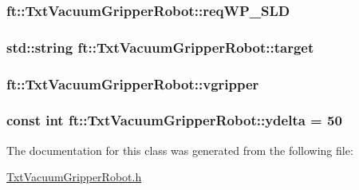 \subsubsection[{\texorpdfstring{req\+W\+P\+\_\+\+S\+LD}{reqWP_SLD}}]{ ft\+::\+Txt\+Vacuum\+Gripper\+Robot\+::req\+W\+P\+\_\+\+S\+LD\hspace{0.3cm}{\ttfamily [protected]}}\hypertarget{classft_1_1_txt_vacuum_gripper_robot_ada2de53763edfcfa88e373f22107dce3}{}\label{classft_1_1_txt_vacuum_gripper_robot_ada2de53763edfcfa88e373f22107dce3}
\subsubsection[{\texorpdfstring{target}{target}}]{\setlength{\rightskip}{0pt plus 5cm}std\+::string ft\+::\+Txt\+Vacuum\+Gripper\+Robot\+::target\hspace{0.3cm}{\ttfamily [protected]}}\hypertarget{classft_1_1_txt_vacuum_gripper_robot_a9ded37d075da735719cc8ee655a69047}{}\label{classft_1_1_txt_vacuum_gripper_robot_a9ded37d075da735719cc8ee655a69047}
\subsubsection[{\texorpdfstring{vgripper}{vgripper}}]{ ft\+::\+Txt\+Vacuum\+Gripper\+Robot\+::vgripper\hspace{0.3cm}{\ttfamily [protected]}}\hypertarget{classft_1_1_txt_vacuum_gripper_robot_a70ee7a25a6cd4a3d108fa044e483f464}{}\label{classft_1_1_txt_vacuum_gripper_robot_a70ee7a25a6cd4a3d108fa044e483f464}
\subsubsection[{\texorpdfstring{ydelta}{ydelta}}]{\setlength{\rightskip}{0pt plus 5cm}const int ft\+::\+Txt\+Vacuum\+Gripper\+Robot\+::ydelta = 50}\hypertarget{classft_1_1_txt_vacuum_gripper_robot_a74c5b29678f0594cdfbde1637a2a9ae7}{}\label{classft_1_1_txt_vacuum_gripper_robot_a74c5b29678f0594cdfbde1637a2a9ae7}


The documentation for this class was generated from the following file\+:\begin{DoxyCompactItemize}
\item 
\hyperlink{_txt_vacuum_gripper_robot_8h}{Txt\+Vacuum\+Gripper\+Robot.\+h}\end{DoxyCompactItemize}
